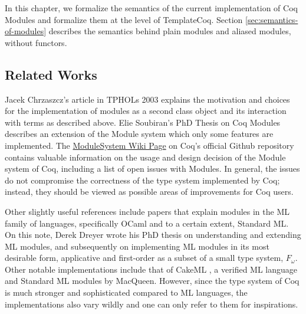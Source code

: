 In this chapter, we formalize the semantics of the current implementation of Coq
Modules and formalize them at the level of TemplateCoq. Section
\ref{sec:semantics-of-modules} describes the semantics behind plain modules and
aliased modules, without functors.


\subsection{Related Works} Jacek Chrzaszcz's article in TPHOLs 2003
 explains the motivation and choices for the implementation
of modules as a second class object and its interaction with terms as described
above.  Elie Soubiran's PhD Thesis on Coq Modules  describes
an extension of the Module system which only some features are implemented. The
\href{https://github.com/coq/coq/wiki/ModuleSystem}{ModuleSystem Wiki Page} on
Coq's official Github repository contains valuable information on the usage and
design decision of the Module system of Coq, including a list of open issues 
with Modules. In general, the issues do not compromise the correctness of the
type system implemented by Coq; instead, they should be viewed as possible areas
of improvements for Coq users.

Other slightly useful references include papers that explain modules in the ML
family of languages, specifically OCaml and to a certain extent, Standard ML.
On this note, Derek Dreyer wrote his PhD thesis  on
understanding and extending ML modules, and subsequently on implementing ML
modules in its most desirable form, applicative and first-order as a subset of a
small type system, $F_\omega$. Other notable implementations
include that of CakeML , a verified ML language and Standard ML
modules by MacQueen. However, since the type
system of Coq is much stronger and sophisticated compared to ML languages, the
implementations also vary wildly and one can only refer to them for
inspirations.


